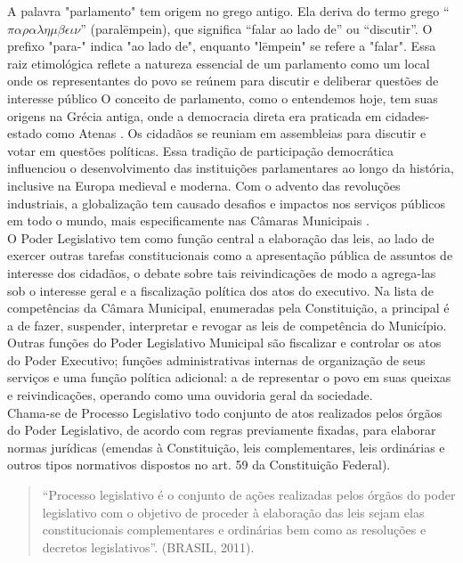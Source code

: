 \documentclass[12pt]{article}
\begin{document}
A palavra "parlamento" tem origem no grego antigo. Ela deriva do termo grego ``$\pi\alpha\rho\alpha\lambda\eta\mu\beta\epsilon\iota\nu$'' (paralēmpein), que significa ``falar ao lado de'' ou ``discutir''. O prefixo "para-" indica "ao lado de", enquanto "lēmpein" se refere a "falar". Essa raiz etimológica reflete a natureza essencial de um parlamento como um local onde os representantes do povo se reúnem para discutir e deliberar questões de interesse público O conceito de parlamento, como o entendemos hoje, tem suas origens na Grécia antiga, onde a democracia direta era praticada em cidades-estado como Atenas \parencite{sathler2016representaccao}. Os cidadãos se reuniam em assembleias para discutir e votar em questões políticas. Essa tradição de participação democrática influenciou o desenvolvimento das instituições parlamentares ao longo da história, inclusive na Europa medieval e moderna. Com o advento das revoluções industriais, a globalização tem causado desafios e impactos nos serviços públicos em todo o mundo, mais especificamente nas Câmaras Municipais \parencite{eirao2013sistema}.\\
 
O Poder Legislativo tem como função central a elaboração das leis, ao lado de exercer outras tarefas constitucionais como a apresentação pública de assuntos de interesse dos cidadãos, o debate sobre tais reivindicações de modo a agrega-las sob o interesse geral e a fiscalização política dos atos do executivo. Na lista de competências da Câmara Municipal, enumeradas pela Constituição, a principal é a de fazer, suspender, interpretar e revogar as leis de competência do Município. Outras funções do Poder Legislativo Municipal são fiscalizar e controlar os atos do Poder Executivo; funções administrativas internas de organização de seus serviços e uma função política adicional: a de representar o povo em suas queixas e reivindicações, operando como uma ouvidoria geral da sociedade.\\

Chama-se de Processo Legislativo todo conjunto de atos realizados pelos órgãos do Poder Legislativo, de acordo com regras previamente fixadas, para elaborar normas jurídicas (emendas à Constituição, leis complementares, leis ordinárias e outros tipos normativos dispostos no art. 59 da Constituição Federal).  

\begin{quote}
``Processo legislativo é o conjunto de ações realizadas pelos órgãos do poder legislativo com o objetivo de proceder à elaboração das leis sejam elas constitucionais complementares e ordinárias bem como as resoluções e decretos legislativos''. (BRASIL, 2011).
\end{quote}
\end{document}
